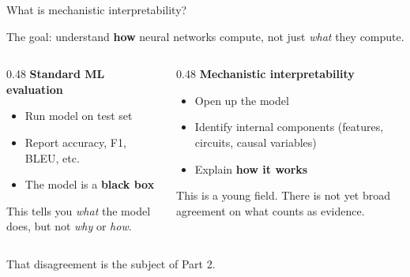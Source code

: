 \documentclass[aspectratio=169,11pt]{beamer}
\begin{document}
\begin{frame}[label=whatmi]{What is mechanistic interpretability?}

The goal: understand \textbf{how} neural networks compute, not just \emph{what} they compute.

\vspace{0.5em}

\begin{columns}[T]
\begin{column}{0.48\textwidth}
\textbf{Standard ML evaluation}
\begin{itemize}\setlength\itemsep{3pt}
  \item {\small Run model on test set}
  \item {\small Report accuracy, F1, BLEU, etc.}
  \item {\small The model is a \textbf{black box}}
\end{itemize}

\vspace{0.3em}
{\small This tells you \emph{what} the model does, but not \emph{why} or \emph{how}.}
\end{column}
\begin{column}{0.48\textwidth}
\textbf{Mechanistic interpretability}
\begin{itemize}\setlength\itemsep{3pt}
  \item {\small Open up the model}
  \item {\small Identify internal components (features, circuits, causal variables)}
  \item {\small Explain \textbf{how it works}}
\end{itemize}

\vspace{0.3em}
{\small This is a young field. There is not yet broad agreement on what counts as evidence.}
\end{column}
\end{columns}

\vspace{0.5em}
{\small That disagreement is the subject of Part 2.}
\end{frame}
\end{document}
